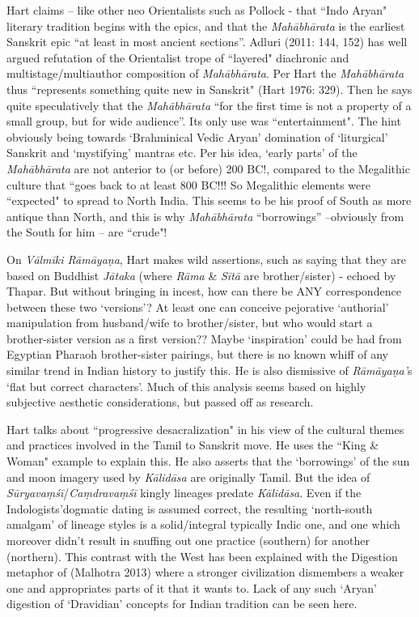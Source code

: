 Hart claims – like other neo Orientalists such as Pollock - that “Indo Aryan" literary tradition begins with the epics, and that the \textit{Mahābhārata} is the earliest Sanskrit epic “at least in most ancient sections”. Adluri (2011: 144, 152) has well argued refutation of the Orientalist trope of “layered" diachronic and multistage/multiauthor composition of \textit{Mahābhārata}. Per Hart the \textit{Mahābhārata} thus “represents something quite new in Sanskrit" (Hart 1976: 329). Then he says quite speculatively that the \textit{Mahābhārata } “for the first time is not a property of a small group, but for wide audience”. Its only use was “entertainment". The hint obviously being towards ‘Brahminical Vedic Aryan’ domination of ‘liturgical’ Sanskrit and ‘mystifying’ mantras etc. Per his idea, ‘early parts’ of the \textit{Mahābhārata } are not anterior to (or before) 200 BC!, compared to the Megalithic culture that “goes back to at least 800 BC!!! So Megalithic elements were “expected" to spread to North India. This seems to be his proof of South as more antique than North, and this is why \textit{Mahābhārata } “borrowings” –obviously from the South for him – are “crude"!

On \textit{Vālmīki Rāmāyaṇa}, Hart makes wild assertions, such as saying that they are based on Buddhist \textit{Jātaka } (where \textit{Rāma} \& \textit{Sītā } are brother/sister) - echoed by Thapar. But without bringing in incest, how can there be ANY correspondence between these two ‘versions’? At least one can conceive pejorative ‘authorial’ manipulation from husband/wife to brother/sister, but who would start a brother-sister version as a first version?? Maybe ‘inspiration’ could be had from Egyptian Pharaoh brother-sister pairings, but there is no known whiff of any similar trend in Indian history to justify this. He is also dismissive of \textit{Rāmāyaṇa’}s ‘flat but correct characters’. Much of this analysis seems based on highly subjective aesthetic considerations, but passed off as research.

Hart talks about “progressive desacralization" in his view of the cultural themes and practices involved in the Tamil to Sanskrit move. He uses the “King \& Woman" example to explain this. He also asserts that the ‘borrowings’ of the sun and moon imagery used by \textit{Kālidāsa} are originally Tamil. But the idea of \textit{Sūryavaṃśī}/\textit{Caṃdravaṃśī} kingly lineages predate \textit{Kālidāsa}. Even if the Indologists’dogmatic dating is assumed correct, the resulting ‘north-south amalgam’ of lineage styles is a solid/integral typically Indic one, and one which moreover didn’t result in snuffing out one practice (southern) for another (northern). This contrast with the West has been explained with the Digestion metaphor of (Malhotra 2013) where a stronger civilization dismembers a weaker one and appropriates parts of it that it wants to. Lack of any such ‘Aryan’ digestion of ‘Dravidian’ concepts for Indian tradition can be seen here.

